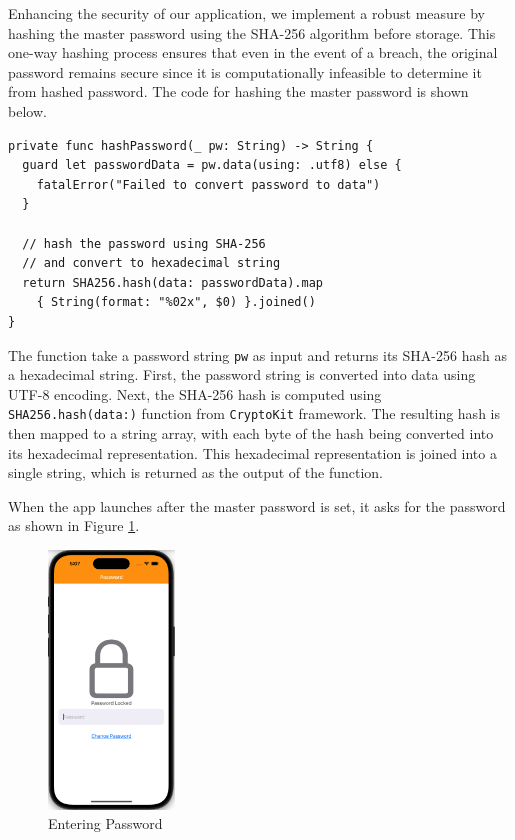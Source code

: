 \documentclass[10pt, titlepage]{article}
\begin{document}
Enhancing the security of our application, we implement a robust measure by hashing the master password using the SHA-256 algorithm before storage. This one-way hashing process ensures that even in the event of a breach, the original password remains secure since it is computationally infeasible to determine it from hashed password. The code for hashing the master password is shown below. 
\begin{center}
\begin{minipage}{\textwidth}
\begin{lstlisting}
private func hashPassword(_ pw: String) -> String {
  guard let passwordData = pw.data(using: .utf8) else {
    fatalError("Failed to convert password to data")
  }

  // hash the password using SHA-256
  // and convert to hexadecimal string
  return SHA256.hash(data: passwordData).map
    { String(format: "%02x", $0) }.joined()
}
\end{lstlisting}
\end{minipage}
\end{center}

The function take a password string \texttt{pw} as input and returns its SHA-256 hash as a hexadecimal string. First, the password string is converted into data using UTF-8 encoding. Next, the SHA-256 hash is computed using \texttt{SHA256.hash(data:)} function from \texttt{CryptoKit} framework. The resulting hash is then mapped to a string array, with each byte of the hash being converted into its hexadecimal representation. This hexadecimal representation is joined into a single string, which is returned as the output of the function. 

When the app launches after the master password is set, it asks for the password as shown in Figure \ref{fig:enter_pw}.
\begin{figure}[H]
	\centering
	\vspace{-0.25em}
	\includegraphics[width=0.3\textwidth]{img/enter_pw}
	\vspace{-0.75em}
	\caption{Entering Password}
	\label{fig:enter_pw}
	\vspace{-0.75em}
\end{figure}
\end{document}
